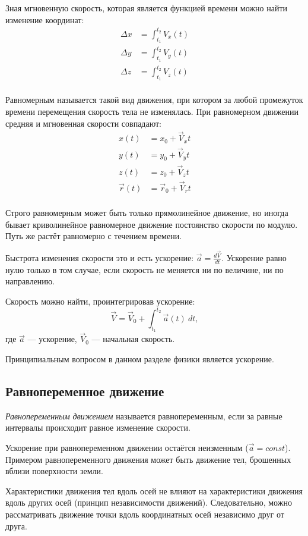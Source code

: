 Зная мгновенную скорость, которая является функцией времени можно найти
изменение координат:
\begin{align*}
	\Delta x & = \int_{t_1}^{t_2} V_x(t) \\
	\Delta y & = \int_{t_1}^{t_2} V_y(t) \\
	\Delta z & = \int_{t_1}^{t_2} V_z(t) \\
\end{align*}

Равномерным называется такой вид движения, при котором за любой промежуток
времени перемещения скорость тела не изменялась. При равномерном движении
средняя и мгновенная скорости совпадают:
\begin{align*}
	x(t)       & = x_0 + \vec{V}_x t       \\
	y(t)       & = y_0 + \vec{V}_y t       \\
	z(t)       & = z_0 + \vec{V}_z t       \\
	\vec{r}(t) & = \vec{r}_0 + \vec{V}_r t \\
\end{align*}

Строго равномерным может быть только прямолинейное движение, но иногда бывает
криволинейное равномерное движение постоянство скорости по модулю. Путь же
растёт равномерно с течением времени.

Быстрота изменения скорости это и есть ускорение: \( \vec{a} = \frac{d
	\vec{V}}{d t} \). Ускорение равно нулю только в том случае, если скорость не
меняется ни по величине, ни по направлению.

Скорость можно найти, проинтегрировав ускорение:
\[
	\vec{V} = \vec{V}_0 + \int_{{t_1}}^{{t_2}} {\vec{a}(t)} \: d{t} {}
	,\] где \( \vec{a} \) --- ускорение, \( \vec{V}_0 \) --- начальная скорость.

Принципиальным вопросом в данном разделе  физики является ускорение.

\subsection{Равнопеременное движение}

\emph{Равнопеременным движением} называется равнопеременным, если за равные
интервалы происходит равное изменение скорости.

Ускорение при равнопеременном движении остаётся неизменным  (\( \vec{a} = const
\)). Примером равнопеременного движения может быть движение тел, брошенных
вблизи поверхности земли.

Характеристики движения тел вдоль осей не влияют на характеристики движения
вдоль других осей (принцип независимости движений). Следовательно, можно
рассматривать движение точки вдоль координатных осей независимо друг от друга.

